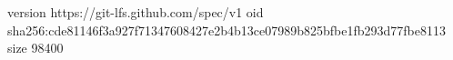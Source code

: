 version https://git-lfs.github.com/spec/v1
oid sha256:cde81146f3a927f71347608427e2b4b13ce07989b825bfbe1fb293d77fbe8113
size 98400
